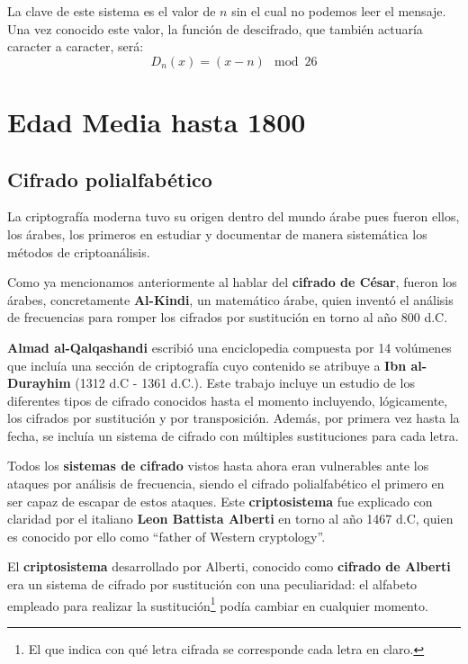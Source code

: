 \documentclass[nochap]{apuntesURJC}
\begin{document}
La clave de este sistema es el valor de $n$ sin el cual no podemos leer el mensaje. Una vez conocido este valor, la función de descifrado, que también actuaría caracter a caracter, será:
\[D_n(x)=(x-n) \mod 26\]

\section{Edad Media hasta 1800}

\subsection{Cifrado polialfabético}
La criptografía moderna tuvo su origen dentro del mundo árabe pues fueron ellos, los árabes, los primeros en estudiar y documentar de manera sistemática los métodos de criptoanálisis.

Como ya mencionamos anteriormente al hablar del \textbf{cifrado de César}, fueron los árabes, concretamente \textbf{Al-Kindi}, un matemático árabe, quien inventó el análisis de frecuencias para romper los cifrados por sustitución en torno al año 800 d.C.

\textbf{Almad al-Qalqashandi} escribió una enciclopedia compuesta por 14 volúmenes que incluía una sección de criptografía cuyo contenido se atribuye a \textbf{Ibn al-Durayhim} (1312 d.C - 1361 d.C.). Este trabajo incluye un estudio de los diferentes tipos de cifrado conocidos hasta el momento incluyendo, lógicamente, los cifrados por sustitución y por transposición. Además, por primera vez hasta la fecha, se incluía un sistema de cifrado con múltiples sustituciones para cada letra.

Todos los \textbf{sistemas de cifrado} vistos hasta ahora eran vulnerables ante los ataques por análisis de frecuencia, siendo el cifrado polialfabético el primero en ser capaz de escapar de estos ataques. Este \textbf{criptosistema} fue explicado con claridad por el italiano \textbf{Leon Battista Alberti} en torno al año 1467 d.C, quien es conocido por ello como ``father of Western cryptology''.

El \textbf{criptosistema} desarrollado por Alberti, conocido como \textbf{cifrado de Alberti} era un sistema de cifrado por sustitución con una peculiaridad: el alfabeto empleado para realizar la sustitución\footnote{El que indica con qué letra cifrada se corresponde cada letra en claro.} podía cambiar en cualquier momento.
\end{document}
